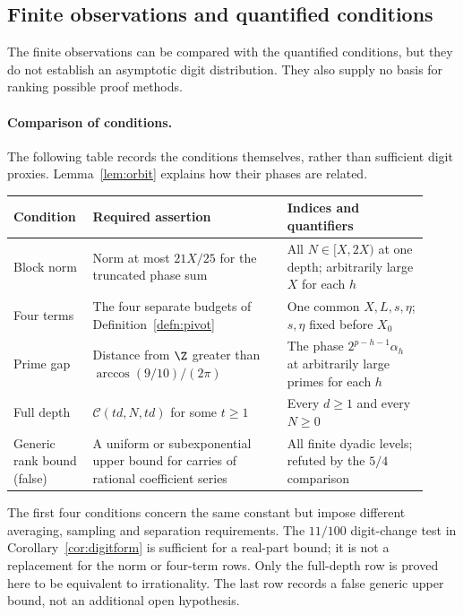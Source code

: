 \subsection{Finite observations and quantified conditions}\label{sub:shape}

The finite observations can be compared with the quantified
conditions, but they do not establish an asymptotic digit distribution.
They also supply no basis for ranking possible proof methods.

\paragraph{Comparison of conditions.}
The following table records the conditions themselves, rather than
sufficient digit proxies. Lemma~\ref{lem:orbit} explains how their phases
are related.

\begin{center}
\setlength{\tabcolsep}{5pt}
\begin{tabular}{>{\raggedright\arraybackslash}p{0.16\linewidth} >{\raggedright\arraybackslash}p{0.44\linewidth} >{\raggedright\arraybackslash}p{0.32\linewidth}}
\hline
Condition & Required assertion & Indices and quantifiers \\
\hline
Block norm & Norm at most $21X/25$ for the truncated phase sum &
All $N\in[X,2X)$ at one depth; arbitrarily large $X$ for each $h$ \\
Four terms & The four separate budgets of Definition~\ref{defn:pivot} &
One common $X,L,s,\eta$; $s,\eta$ fixed before $X_0$ \\
Prime gap & Distance from $\Z$ greater than $\arccos(9/10)/(2\pi)$ &
The phase $2^{p-h-1}\alpha_h$ at arbitrarily large primes for each $h$ \\
Full depth & $\mathcal C(td,N,td)$ for some $t\ge1$ &
Every $d\ge1$ and every $N\ge0$ \\
Generic rank bound (false) & A uniform or subexponential upper bound for carries of rational coefficient series &
All finite dyadic levels; refuted by the $5/4$ comparison \\
\hline
\end{tabular}
\end{center}

\noindent
The first four conditions concern the same constant but impose different
averaging, sampling and separation requirements. The $11/100$ digit-change
test in Corollary~\ref{cor:digitform} is sufficient for a real-part bound;
it is not a replacement for the norm or four-term rows. Only the full-depth
row is proved here to be equivalent to irrationality. The last row records
a false generic upper bound, not an additional open hypothesis.

